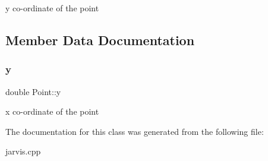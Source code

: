 y co-\/ordinate of the point 

\subsection{Member Data Documentation}
\mbox{\label{classPoint_afa38be143ae800e6ad69ce8ed4df62d8}} 
\subsubsection{\texorpdfstring{y}{y}}
{\footnotesize\ttfamily double Point\+::y}

x co-\/ordinate of the point 

The documentation for this class was generated from the following file\+:\begin{DoxyCompactItemize}
\item 
jarvis.\+cpp\end{DoxyCompactItemize}
